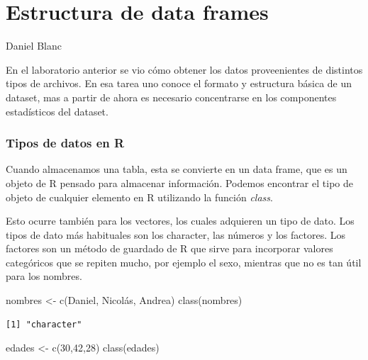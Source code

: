 \documentclass[
  letterpaper,
  DIV=11,
  numbers=noendperiod]{scrreprt}
\newenvironment{Shaded}{\begin{snugshade}}{\end{snugshade}}
\newcommand{\DecValTok}[1]{\textcolor[rgb]{0.68,0.00,0.00}{#1}}
\newcommand{\FunctionTok}[1]{\textcolor[rgb]{0.28,0.35,0.67}{#1}}
\newcommand{\NormalTok}[1]{\textcolor[rgb]{0.00,0.23,0.31}{#1}}
\newcommand{\OtherTok}[1]{\textcolor[rgb]{0.00,0.23,0.31}{#1}}
\newcommand{\StringTok}[1]{\textcolor[rgb]{0.13,0.47,0.30}{#1}}
\begin{document}

\hypertarget{estructura-de-data-frames}{%
\chapter{Estructura de data frames}\label{estructura-de-data-frames}}

Daniel Blanc

\hfill\break

En el laboratorio anterior se vio cómo obtener los datos proveenientes
de distintos tipos de archivos. En esa tarea uno conoce el formato y
estructura básica de un dataset, mas a partir de ahora es necesario
concentrarse en los componentes estadísticos del dataset.

\hypertarget{tipos-de-datos-en-r}{%
\subsection{Tipos de datos en R}\label{tipos-de-datos-en-r}}

Cuando almacenamos una tabla, esta se convierte en un data frame, que es
un objeto de R pensado para almacenar información. Podemos encontrar el
tipo de objeto de cualquier elemento en R utilizando la función
\emph{class}.

Esto ocurre también para los vectores, los cuales adquieren un tipo de
dato. Los tipos de dato más habituales son los character, las números y
los factores. Los factores son un método de guardado de R que sirve para
incorporar valores categóricos que se repiten mucho, por ejemplo el
sexo, mientras que no es tan útil para los nombres.

\begin{Shaded}
\begin{Highlighting}[]
\NormalTok{nombres }\OtherTok{\textless{}{-}} \FunctionTok{c}\NormalTok{(}\StringTok{\textquotesingle{}Daniel\textquotesingle{}}\NormalTok{, }\StringTok{\textquotesingle{}Nicolás\textquotesingle{}}\NormalTok{, }\StringTok{\textquotesingle{}Andrea\textquotesingle{}}\NormalTok{)}
\FunctionTok{class}\NormalTok{(nombres)}
\end{Highlighting}
\end{Shaded}

\begin{verbatim}
[1] "character"
\end{verbatim}

\begin{Shaded}
\begin{Highlighting}[]
\NormalTok{edades }\OtherTok{\textless{}{-}} \FunctionTok{c}\NormalTok{(}\DecValTok{30}\NormalTok{,}\DecValTok{42}\NormalTok{,}\DecValTok{28}\NormalTok{)}
\FunctionTok{class}\NormalTok{(edades)}
\end{Highlighting}
\end{Shaded}
\end{document}
